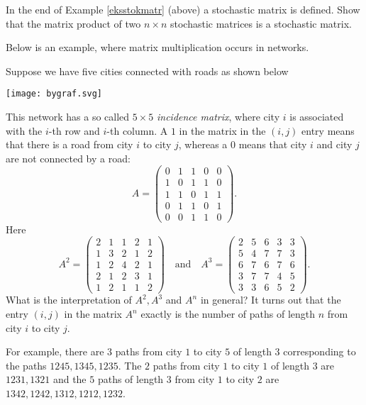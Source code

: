 \documentclass{article}
\begin{document}
\beginshex
In the end of Example \ref{eksstokmatr} (above) a stochastic matrix is defined. Show that
the matrix product of two $n\times n$ stochastic matrices is a stochastic matrix.
\endshex

Below is an example, where  matrix multiplication occurs in networks.

\begin{example}
  Suppose we have five cities connected with roads as shown below

\texttt{[image: bygraf.svg]}

This network has a so called $5\times 5$ \emph{incidence matrix}, where city $i$ is associated with the
$i$-th row and $i$-th column. A $1$ in the matrix in the $(i, j)$ entry means that there is a road
from city $i$ to city $j$, whereas a $0$ means that city $i$ and city $j$ are not connected by a road:
$$
A = \begin{pmatrix}
0 & 1 & 1 & 0 & 0\\
1 & 0 & 1 & 1 & 0\\
1 & 1 & 0 & 1 & 1\\
0 & 1 & 1 & 0 & 1\\
0 & 0 & 1 & 1 & 0
\end{pmatrix}.
$$
Here
$$
A^2 =  
\begin{pmatrix}
2 & 1 & 1 & 2 & 1 \\
1 & 3 & 2 & 1 & 2 \\
1 & 2 & 4 & 2 & 1 \\
2 & 1 & 2 & 3 & 1 \\
1 & 2 & 1 & 1 & 2 
\end{pmatrix}\quad\text{and}\quad
A^3 =
\begin{pmatrix}
 2 & 5 & 6 & 3 & 3 \\
 5 & 4 & 7 & 7 & 3 \\
 6 & 7 & 6 & 7 & 6 \\
 3 & 7 & 7 & 4 & 5 \\
 3 & 3 & 6 & 5 & 2 
\end{pmatrix}.
$$
What is the interpretation of $A^2, A^3$ and  $A^n$ in general?
It turns out that the entry $(i, j)$ in the matrix $A^n$ exactly is
the number of paths of length $n$ from city $i$ to city $j$.


For example, there are $3$ paths from city $1$ to city $5$ of length $3$
corresponding to the paths $1245, 1345, 1235$.  The $2$ paths from city $1$ to city $1$ of
length $3$ are $1231, 1321$ and the  $5$ paths of length $3$ from city $1$ to city 
$2$ are $1342, 1242, 1312, 1212, 1232$.



\end{example}
\end{document}
